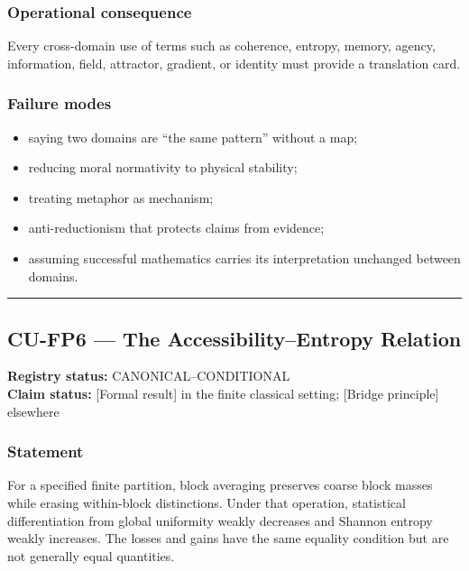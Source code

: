 \documentclass[
  11pt,
]{article}
\providecommand{\tightlist}{%
  \setlength{\itemsep}{0pt}\setlength{\parskip}{0pt}}
\begin{document}
\subsubsection{Operational consequence}\label{operational-consequence-4}

Every cross-domain use of terms such as coherence, entropy, memory,
agency, information, field, attractor, gradient, or identity must
provide a translation card.

\subsubsection{Failure modes}\label{failure-modes-4}

\begin{itemize}
\tightlist
\item
  saying two domains are ``the same pattern'' without a map;
\item
  reducing moral normativity to physical stability;
\item
  treating metaphor as mechanism;
\item
  anti-reductionism that protects claims from evidence;
\item
  assuming successful mathematics carries its interpretation unchanged
  between domains.
\end{itemize}

\begin{center}\rule{0.5\linewidth}{0.5pt}\end{center}

\subsection{CU-FP6 --- The Accessibility--Entropy
Relation}\label{cu-fp6-the-accessibilityentropy-relation}

\textbf{Registry status:} CANONICAL--CONDITIONAL\\
\textbf{Claim status:} {[}Formal result{]} in the finite classical
setting; {[}Bridge principle{]} elsewhere

\subsubsection{Statement}\label{statement-5}

For a specified finite partition, block averaging preserves coarse block
masses while erasing within-block distinctions. Under that operation,
statistical differentiation from global uniformity weakly decreases and
Shannon entropy weakly increases. The losses and gains have the same
equality condition but are not generally equal quantities.
\end{document}
